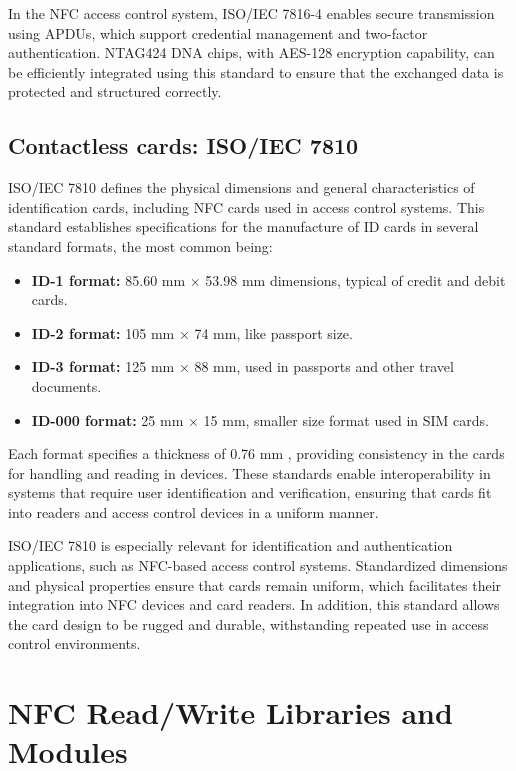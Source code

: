In the NFC access control system, ISO/IEC 7816-4 enables secure transmission using APDUs, which support credential management and two-factor authentication. NTAG424 DNA chips, with AES-128 encryption capability, can be efficiently integrated using this standard to ensure that the exchanged data is protected and structured correctly.

\subsection{Contactless cards: ISO/IEC 7810}

ISO/IEC 7810 \cite{ref25} defines the physical dimensions and general characteristics of identification cards, including NFC cards used in access control systems. This standard establishes specifications for the manufacture of ID cards in several standard formats, the most common being:

\begin{itemize}
	\item \textbf{ID-1 format:} 85.60 mm × 53.98 mm dimensions, typical of credit and debit cards.
	\item \textbf{ID-2 format:} 105 mm × 74 mm, like passport size.
	\item \textbf{ID-3 format:} 125 mm × 88 mm, used in passports and other travel documents.
	\item \textbf{ID-000 format:} 25 mm × 15 mm, smaller size format used in SIM cards.
\end{itemize}

Each format specifies a thickness of 0.76 mm \cite{ref25}, providing consistency in the cards for handling and reading in devices. These standards enable interoperability in systems that require user identification and verification, ensuring that cards fit into readers and access control devices in a uniform manner.

ISO/IEC 7810 is especially relevant for identification and authentication applications, such as NFC-based access control systems. Standardized dimensions and physical properties ensure that cards remain uniform, which facilitates their integration into NFC devices and card readers. In addition, this standard allows the card design to be rugged and durable, withstanding repeated use in access control environments.


\section{NFC Read/Write Libraries and Modules}
\label{sec:nfc_libs}


